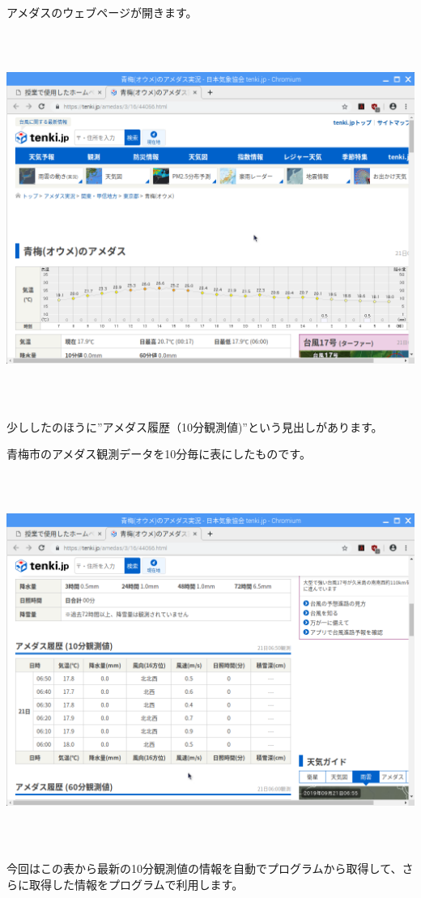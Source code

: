 \documentclass[a4paper,12pt,dvipdfmx]{jarticle}
\begin{document}
\bigskip


\bigskip

アメダスのウェブページが開きます。

\begin{center}
\includegraphics[width=17.006cm,height=12.157cm]{textbook-img028.png}

\end{center}
\clearpage
少ししたのほうに”アメダス履歴（10分観測値)”という見出しがあります。

青梅市のアメダス観測データを10分毎に表にしたものです。



\begin{center}
\includegraphics[width=17.006cm,height=12.157cm]{textbook-img029.png}

\end{center}
今回はこの表から最新の10分観測値の情報を自動でプログラムから取得して、さらに取得した情報をプログラムで利用します。
\end{document}
